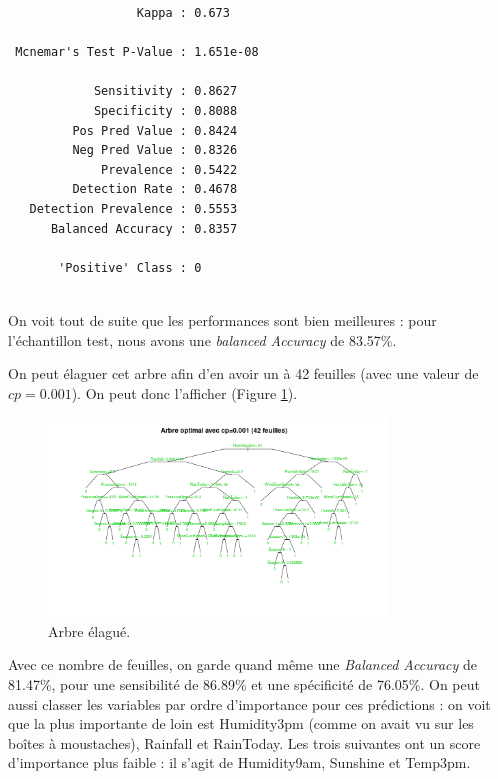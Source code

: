 \documentclass{article}
\begin{document}
\begin{multicols}{2}
\begin{verbatim}
                  Kappa : 0.673           
                                          
 Mcnemar's Test P-Value : 1.651e-08       
                                          
            Sensitivity : 0.8627          
            Specificity : 0.8088          
         Pos Pred Value : 0.8424          
         Neg Pred Value : 0.8326          
             Prevalence : 0.5422          
         Detection Rate : 0.4678          
   Detection Prevalence : 0.5553          
      Balanced Accuracy : 0.8357          
                                          
       'Positive' Class : 0               
                              
    \end{verbatim}
\end{multicols}
     
On voit tout de suite que les performances sont bien meilleures : pour l'échantillon test, nous avons une \emph{balanced Accuracy} de 83.57\%. 

On peut élaguer cet arbre afin d'en avoir un à 42 feuilles (avec une valeur de $cp=0.001$). On peut donc l'afficher (Figure \ref{fig:topt}). 

\begin{figure}[H]
    \centering
    \includegraphics[width=0.8\textwidth]{Images/topt.png}
    \caption{Arbre élagué.}
    \label{fig:topt}
\end{figure}

Avec ce nombre de feuilles, on garde quand même une \emph{Balanced Accuracy} de 81.47\%, pour une sensibilité de 86.89\% et une spécificité de 76.05\%. On peut aussi classer les variables par ordre d'importance pour ces prédictions : on voit que la plus importante de loin est Humidity3pm (comme on avait vu sur les boîtes à moustaches), Rainfall et RainToday. Les trois suivantes ont un score d'importance plus faible : il s'agit de Humidity9am, Sunshine et Temp3pm.
\end{document}
